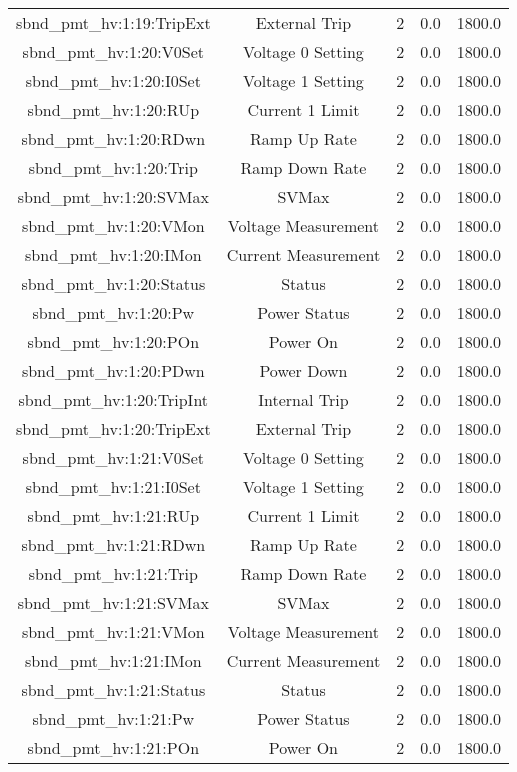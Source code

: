 \begin{table}[ptb]
\begin{tabular}{c | c c c c}
sbnd_pmt_hv:1:19:TripExt & External Trip & 2 & 0.0 & 1800.0\\ 
sbnd_pmt_hv:1:20:V0Set & Voltage 0 Setting & 2 & 0.0 & 1800.0\\ 
sbnd_pmt_hv:1:20:I0Set & Voltage 1 Setting & 2 & 0.0 & 1800.0\\ 
sbnd_pmt_hv:1:20:RUp & Current 1 Limit & 2 & 0.0 & 1800.0\\ 
sbnd_pmt_hv:1:20:RDwn & Ramp Up Rate & 2 & 0.0 & 1800.0\\ 
sbnd_pmt_hv:1:20:Trip & Ramp Down Rate & 2 & 0.0 & 1800.0\\ 
sbnd_pmt_hv:1:20:SVMax & SVMax & 2 & 0.0 & 1800.0\\ 
sbnd_pmt_hv:1:20:VMon & Voltage Measurement & 2 & 0.0 & 1800.0\\ 
sbnd_pmt_hv:1:20:IMon & Current Measurement & 2 & 0.0 & 1800.0\\ 
sbnd_pmt_hv:1:20:Status & Status & 2 & 0.0 & 1800.0\\ 
sbnd_pmt_hv:1:20:Pw & Power Status & 2 & 0.0 & 1800.0\\ 
sbnd_pmt_hv:1:20:POn & Power On & 2 & 0.0 & 1800.0\\ 
sbnd_pmt_hv:1:20:PDwn & Power Down & 2 & 0.0 & 1800.0\\ 
sbnd_pmt_hv:1:20:TripInt & Internal Trip & 2 & 0.0 & 1800.0\\ 
sbnd_pmt_hv:1:20:TripExt & External Trip & 2 & 0.0 & 1800.0\\ 
sbnd_pmt_hv:1:21:V0Set & Voltage 0 Setting & 2 & 0.0 & 1800.0\\ 
sbnd_pmt_hv:1:21:I0Set & Voltage 1 Setting & 2 & 0.0 & 1800.0\\ 
sbnd_pmt_hv:1:21:RUp & Current 1 Limit & 2 & 0.0 & 1800.0\\ 
sbnd_pmt_hv:1:21:RDwn & Ramp Up Rate & 2 & 0.0 & 1800.0\\ 
sbnd_pmt_hv:1:21:Trip & Ramp Down Rate & 2 & 0.0 & 1800.0\\ 
sbnd_pmt_hv:1:21:SVMax & SVMax & 2 & 0.0 & 1800.0\\ 
sbnd_pmt_hv:1:21:VMon & Voltage Measurement & 2 & 0.0 & 1800.0\\ 
sbnd_pmt_hv:1:21:IMon & Current Measurement & 2 & 0.0 & 1800.0\\ 
sbnd_pmt_hv:1:21:Status & Status & 2 & 0.0 & 1800.0\\ 
sbnd_pmt_hv:1:21:Pw & Power Status & 2 & 0.0 & 1800.0\\ 
sbnd_pmt_hv:1:21:POn & Power On & 2 & 0.0 & 1800.0\\ 

\end{tabular}
\end{table}
